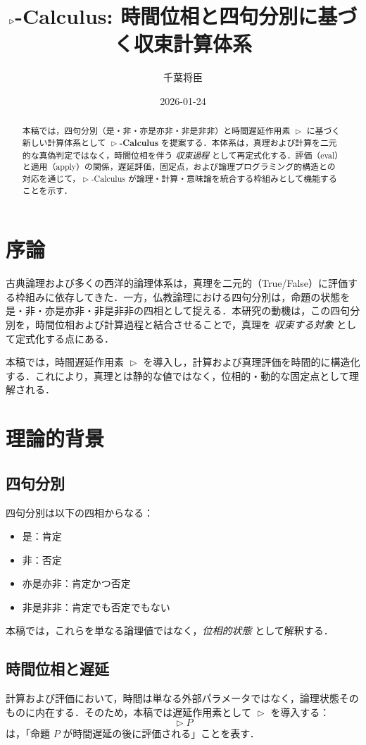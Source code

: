 \documentclass[uplatex,12pt,a4paper]{jsarticle}
\title{$\delay$-Calculus: 時間位相と四句分別に基づく収束計算体系}
\author{千葉将臣}
\date{2026-01-24}
\newcommand{\delay}{\mathrel{\triangleright}}
\begin{document}
\maketitle

\begin{abstract}
本稿では，四句分別（是・非・亦是亦非・非是非非）と時間遅延作用素 $\delay$ に基づく新しい計算体系として \textbf{$\delay$-Calculus} を提案する．本体系は，真理および計算を二元的な真偽判定ではなく，時間位相を伴う \emph{収束過程} として再定式化する．評価（eval）と適用（apply）の関係，遅延評価，固定点，および論理プログラミング的構造との対応を通じて，$\delay$-Calculus が論理・計算・意味論を統合する枠組みとして機能することを示す．
\end{abstract}

\section{序論}
古典論理および多くの西洋的論理体系は，真理を二元的（True/False）に評価する枠組みに依存してきた．一方，仏教論理における四句分別は，命題の状態を是・非・亦是亦非・非是非非の四相として捉える．本研究の動機は，この四句分別を，時間位相および計算過程と結合させることで，真理を \emph{収束する対象} として定式化する点にある．

本稿では，時間遅延作用素 $\delay$ を導入し，計算および真理評価を時間的に構造化する．これにより，真理とは静的な値ではなく，位相的・動的な固定点として理解される．

\section{理論的背景}

\subsection{四句分別}
四句分別は以下の四相からなる：
\begin{itemize}
\item 是：肯定
\item 非：否定
\item 亦是亦非：肯定かつ否定
\item 非是非非：肯定でも否定でもない
\end{itemize}

本稿では，これらを単なる論理値ではなく，\emph{位相的状態} として解釈する．

\subsection{時間位相と遅延}
計算および評価において，時間は単なる外部パラメータではなく，論理状態そのものに内在する．そのため，本稿では遅延作用素として $\delay$ を導入する：
\begin{equation}
\delay P
\end{equation}
は，「命題 $P$ が時間遅延の後に評価される」ことを表す．
\end{document}
